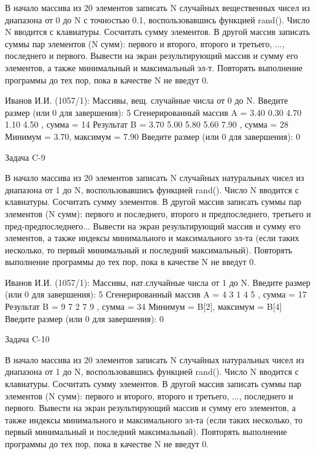 В начало массива из 20 элементов записать N случайных вещественных чисел из
диапазона от 0 до N с точностью 0.1, воспользовавшись функцией rand(). Число N
вводится с клавиатуры. Сосчитать сумму элементов. В другой массив записать
суммы пар элементов (N сумм): первого и второго, второго и третьего, ...,
последнего и первого. Вывести на экран результирующий массив и сумму его
элементов, а также минимальный и максимальный эл-т. Повторять выполнение
программы до тех пор, пока в качестве N не введут 0.

Иванов И.И. (1057/1): Массивы, вещ. случайные числа от 0 до N.
Введите размер (или 0 для завершения): 5
Сгенерированный массив A = { 3.40 0.30 4.70 1.10 4.50 }, сумма = 14
Результат B = { 3.70 5.00 5.80 5.60 7.90 }, сумма = 28
Минимум = 3.70, максимум = 7.90
Введите размер (или 0 для завершения): 0


Задача C-9

В начало массива из 20 элементов записать N случайных натуральных чисел из
диапазона от 1 до N, воспользовавшись функцией rand(). Число N вводится с
клавиатуры. Сосчитать сумму элементов. В другой массив записать суммы пар
элементов (N сумм): первого и последнего, второго и предпоследнего, третьего и
пред-предпоследнего... Вывести на экран результирующий массив и сумму его
элементов, а также индексы минимального и максимального эл-та (если таких
несколько, то первый минимальный и последний максимальный). Повторять
выполнение программы до тех пор, пока в качестве N не введут 0.

Иванов И.И. (1057/1): Массивы, нат.случайные числа от 1 до N.
Введите размер (или 0 для завершения): 5
Сгенерированный массив A = { 4 3 1 4 5 }, сумма = 17
Результат B = { 9 7 2 7 9 }, сумма = 34
Минимум = B[2], максимум = B[4]
Введите размер (или 0 для завершения): 0


Задача C-10

В начало массива из 20 элементов записать N случайных натуральных чисел из
диапазона от 1 до N, воспользовавшись функцией rand(). Число N вводится с
клавиатуры. Сосчитать сумму элементов. В другой массив записать суммы пар
элементов (N сумм): первого и второго, второго и третьего, ..., последнего и
первого. Вывести на экран результирующий массив и сумму его элементов, а также
индексы минимального и максимального эл-та (если таких несколько, то первый
минимальный и последний максимальный). Повторять выполнение программы до тех
пор, пока в качестве N не введут 0.


